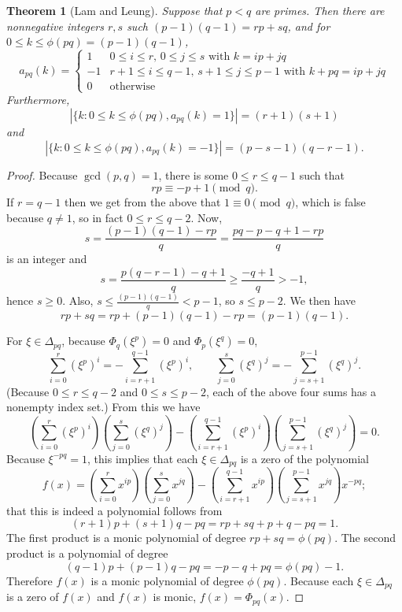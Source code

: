 \documentclass{amsart}
\newtheorem{theorem}{Theorem}
\theoremstyle{definition}
\begin{document}
\begin{theorem}[Lam and Leung]
Suppose that $p<q$ are primes. Then there are  nonnegative integers $r,s$ such
$(p-1)(q-1)=rp+sq$, and for
$0 \leq k \leq \phi(pq)=(p-1)(q-1)$,
\[
a_{pq}(k) = \begin{cases}
1&\textrm{$0 \leq i \leq r$, $0 \leq j \leq s$ with $k=ip+jq$}\\
-1&\textrm{$r+1 \leq i \leq q-1$, $s+1 \leq j \leq p-1$ with $k+pq=ip+jq$}\\
0&\textrm{otherwise}
\end{cases}
\]
Furthermore,
\[
|\{k: 0 \leq k \leq \phi(pq), a_{pq}(k)=1\}| = (r+1)(s+1)
\]
and
\[
|\{k: 0 \leq k \leq \phi(pq), a_{pq}(k)=-1\}| = (p-s-1)(q-r-1).
\]
\end{theorem}
\begin{proof}
Because $\gcd(p,q)=1$, there is some $0 \leq r \leq q-1$ such that
\[
rp   \equiv -p+1  \pmod{q}.
\]
If $r=q-1$ then we get
from the above that $1 \equiv 0 \pmod{q}$, which is false because $q \neq 1$, so in fact
$0 \leq r \leq q-2$. 
Now,
\[
s=\frac{(p-1)(q-1)-rp}{q}=\frac{pq-p-q+1-rp}{q} 
\]
is an integer and
\[
s = \frac{p(q-r-1)-q+1}{q} \geq \frac{-q+1}{q}>-1,
\]
hence $s \geq 0$. Also,
$s \leq \frac{(p-1)(q-1)}{q} < p-1$, so $s \leq p-2$. We then have
\[
rp+sq=rp+(p-1)(q-1)-rp = (p-1)(q-1).
\]
 
For $\xi \in \Delta_{pq}$, because $\Phi_q(\xi^p)=0$ and $\Phi_p(\xi^q)=0$,
\[
\sum_{i=0}^r (\xi^p)^i = - \sum_{i=r+1}^{q-1} (\xi^p)^i,
\qquad
\sum_{j=0}^s (\xi^q)^j = - \sum_{j=s+1}^{p-1} (\xi^q)^j.
\]
(Because $0 \leq r \leq q-2$ and $0 \leq s \leq p-2$, each of the above four sums has a nonempty index
set.)
From this we have
\[
\left( \sum_{i=0}^r (\xi^p)^i \right) \left(\sum_{j=0}^s (\xi^q)^j \right)
-\left(\sum_{i=r+1}^{q-1} (\xi^p)^i\right) \left( \sum_{j=s+1}^{p-1} (\xi^q)^j\right)=0.
\]
Because $\xi^{-pq}=1$, 
this implies that each $\xi \in \Delta_{pq}$ is a zero of the polynomial
\[
f(x)  = \left( \sum_{i=0}^r x^{ip} \right) \left(\sum_{j=0}^s x^{jq} \right)
-\left(\sum_{i=r+1}^{q-1} x^{ip} \right) \left( \sum_{j=s+1}^{p-1} x^{jq} \right) x^{-pq};
\]
that this is indeed a polynomial follows from
\[
(r+1)p+(s+1)q-pq=rp+sq+p+q-pq=1.
\]
The first product is a monic polynomial of degree $rp+sq=\phi(pq)$. The second product is a polynomial
of degree
\[
(q-1)p+(p-1)q-pq=-p-q+pq=\phi(pq)-1.
\]
Therefore $f(x)$ is a monic polynomial of degree
$\phi(pq)$. Because each $\xi \in \Delta_{pq}$ is a zero of $f(x)$ and $f(x)$ is monic,
$f(x)=\Phi_{pq}(x)$. 
\end{proof}
\end{document}
